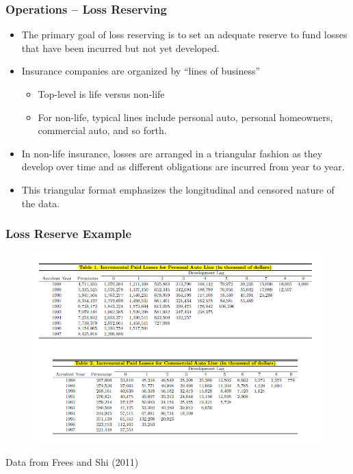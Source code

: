 \documentclass[serif,10pt]{beamer}
\begin{document}
\begin{frame}
\frametitle{Operations -- Loss Reserving}
\begin{itemize}
\item The primary goal of loss reserving is to set an adequate reserve to fund losses that have been incurred but not yet developed.
\item Insurance companies are organized by ``lines of business''
\begin{itemize}
\item Top-level is life versus non-life
\item For non-life, typical lines include personal auto, personal homeowners, commercial auto, and so forth.
\end{itemize}
\item In non-life insurance, losses are arranged in a triangular fashion as they
develop over time and as different obligations are incurred from year to year.
\item This triangular format emphasizes the longitudinal and censored nature of the data.
\end{itemize}
\end{frame}

\begin{frame}
\frametitle{Loss Reserve Example}
\vspace{-.1in}
\begin{figure}[htp]
  \begin{center}
\includegraphics[width=1\textwidth]{Figures/LossFreesShi2011.png}
  \end{center}
\end{figure}
\vspace{-.1in}
Data from Frees and Shi (2011)
\end{frame}
\end{document}
